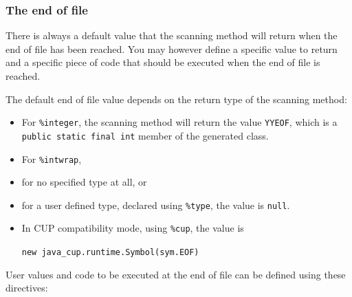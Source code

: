 \subsubsection{The end of file}\label{the-end-of-file}

There is always a default value that the scanning method will return
when the end of file has been reached. You may however define a specific
value to return and a specific piece of code that should be executed
when the end of file is reached.

The default end of file value depends on the return type of the scanning
method:

\begin{itemize}
\item
  For \texttt{\%integer}, the scanning method will return the value
  \texttt{YYEOF}, which is a \texttt{public\ static\ final\ int} member
  of the generated class.
\item
  For \texttt{\%intwrap},
\item
  for no specified type at all, or
\item
  for a user defined type, declared using \texttt{\%type}, the value is
  \texttt{null}.
\item
  In CUP compatibility mode, using \texttt{\%cup}, the value is

  \texttt{new\ java\_cup.runtime.Symbol(sym.EOF)}
\end{itemize}

User values and code to be executed at the end of file can be defined
using these directives:

